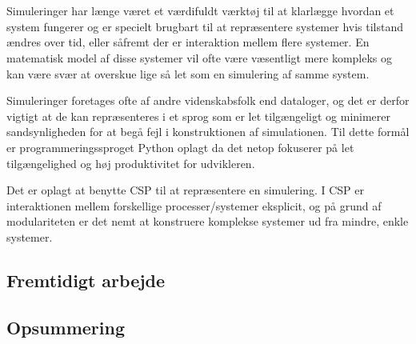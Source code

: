 \chapter{\Des}
\begin{shaded}
Simuleringer har længe været et værdifuldt værktøj til at klarlægge hvordan et 
system fungerer og er specielt brugbart til at repræsentere systemer hvis 
tilstand ændres over tid, eller såfremt der er interaktion mellem flere systemer. En 
matematisk model af disse systemer vil ofte være væsentligt mere kompleks og 
kan være svær at overskue lige så let som en simulering af samme system. 

Simuleringer foretages ofte af andre videnskabsfolk end dataloger, og det er 
derfor vigtigt at de kan repræsenteres i et sprog som er let tilgængeligt og 
minimerer sandsynligheden for at begå fejl i konstruktionen af simulationen.  
Til dette formål er programmeringssproget Python oplagt da det netop fokuserer 
på let tilgængelighed og høj produktivitet for udvikleren. 

Det er oplagt at benytte CSP\cite{hoare-csp} til at repræsentere en simulering.  
I CSP er interaktionen mellem forskellige processer/systemer eksplicit, og på 
grund af modulariteten er det nemt at konstruere komplekse systemer ud fra 
mindre, enkle systemer. 
\end{shaded}



 

\section{Fremtidigt arbejde}
\section{Opsummering}
